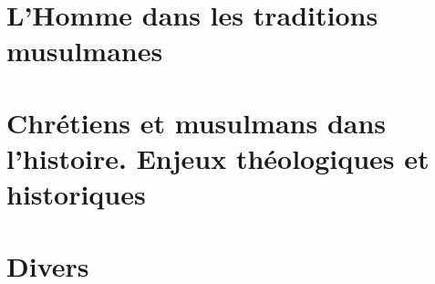 \documentclass[oneside,10pt]{book} %
\begin{document}
 
  

  \part{L'Homme dans les traditions musulmanes}
 
 
 
 
 
    
   

   
%

 


 \part{Chrétiens et musulmans dans l'histoire. Enjeux théologiques et historiques}















%

 \part{Divers}
 
\backmatter


%

\listoftheorems[ignoreall,show={Def}]

\end{document}
